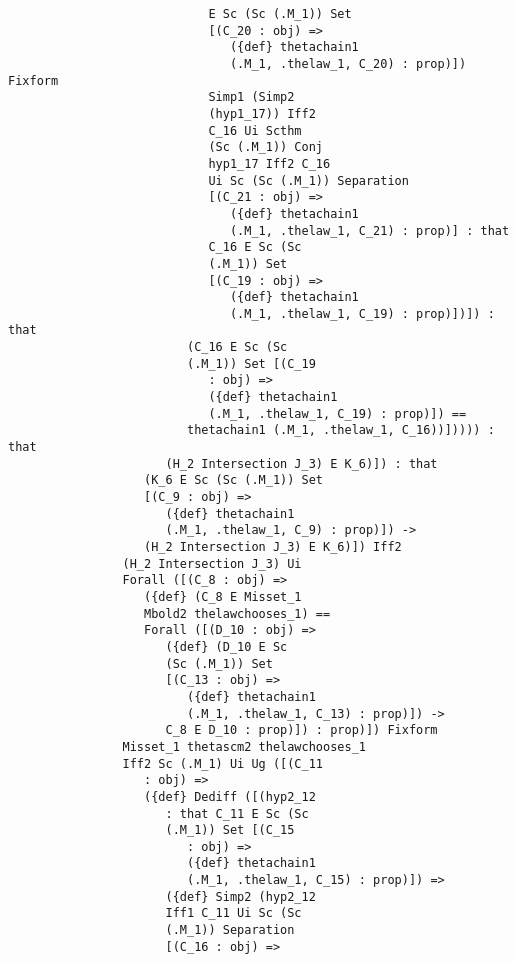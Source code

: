 \documentclass[12pt]{article}
\begin{document}
\begin{verbatim}
                            E Sc (Sc (.M_1)) Set 
                            [(C_20 : obj) => 
                               ({def} thetachain1 
                               (.M_1, .thelaw_1, C_20) : prop)]) Fixform 
                            Simp1 (Simp2 
                            (hyp1_17)) Iff2 
                            C_16 Ui Scthm 
                            (Sc (.M_1)) Conj 
                            hyp1_17 Iff2 C_16 
                            Ui Sc (Sc (.M_1)) Separation 
                            [(C_21 : obj) => 
                               ({def} thetachain1 
                               (.M_1, .thelaw_1, C_21) : prop)] : that 
                            C_16 E Sc (Sc 
                            (.M_1)) Set 
                            [(C_19 : obj) => 
                               ({def} thetachain1 
                               (.M_1, .thelaw_1, C_19) : prop)])]) : that 
                         (C_16 E Sc (Sc 
                         (.M_1)) Set [(C_19 
                            : obj) => 
                            ({def} thetachain1 
                            (.M_1, .thelaw_1, C_19) : prop)]) == 
                         thetachain1 (.M_1, .thelaw_1, C_16))])))) : that 
                      (H_2 Intersection J_3) E K_6)]) : that 
                   (K_6 E Sc (Sc (.M_1)) Set 
                   [(C_9 : obj) => 
                      ({def} thetachain1 
                      (.M_1, .thelaw_1, C_9) : prop)]) -> 
                   (H_2 Intersection J_3) E K_6)]) Iff2 
                (H_2 Intersection J_3) Ui 
                Forall ([(C_8 : obj) => 
                   ({def} (C_8 E Misset_1 
                   Mbold2 thelawchooses_1) == 
                   Forall ([(D_10 : obj) => 
                      ({def} (D_10 E Sc 
                      (Sc (.M_1)) Set 
                      [(C_13 : obj) => 
                         ({def} thetachain1 
                         (.M_1, .thelaw_1, C_13) : prop)]) -> 
                      C_8 E D_10 : prop)]) : prop)]) Fixform 
                Misset_1 thetascm2 thelawchooses_1 
                Iff2 Sc (.M_1) Ui Ug ([(C_11 
                   : obj) => 
                   ({def} Dediff ([(hyp2_12 
                      : that C_11 E Sc (Sc 
                      (.M_1)) Set [(C_15 
                         : obj) => 
                         ({def} thetachain1 
                         (.M_1, .thelaw_1, C_15) : prop)]) => 
                      ({def} Simp2 (hyp2_12 
                      Iff1 C_11 Ui Sc (Sc 
                      (.M_1)) Separation 
                      [(C_16 : obj) => 

\end{verbatim}
\end{document}
